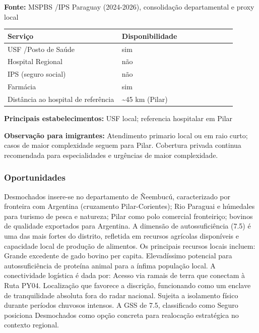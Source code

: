 \textbf{Fonte:} MSPBS /\allowbreak  IPS Paraguay (2024-2026), consolidação
departamental e proxy local

{\def\LTcaptype{none} %
\begin{longtable}{@{}>{\raggedright\arraybackslash}p{0.45\linewidth} >{\raggedright\arraybackslash}p{0.45\linewidth}@{}}
\toprule\noalign{}
Serviço & Disponibilidade \\
\midrule\noalign{}
\endhead
\bottomrule\noalign{}
\endlastfoot
USF /\allowbreak  Posto de Saúde & sim \\
Hospital Regional & não \\
IPS (seguro social) & não \\
Farmácia & sim \\
Distância ao hospital de referência & \textasciitilde45 km (Pilar) \\
\end{longtable}
}

\textbf{Principais estabelecimentos:} USF local; referencia hospitalar
em Pilar

\textbf{Observação para imigrantes:} Atendimento primario local ou em
raio curto; casos de maior complexidade seguem para Pilar. Cobertura
privada continua recomendada para especialidades e urgências de maior
complexidade.
\newpage

\subsubsection*{Oportunidades}\label{oport-desmochados-1204}
Desmochados insere-se no departamento de Ñeembucú, caracterizado por fronteira com Argentina (cruzamento Pilar-Corientes); Rio Paraguai e húmedales para turismo de pesca e natureza; Pilar como polo comercial fronteiriço; bovinos de qualidade exportados para Argentina. A dimensão de autossuficiência (7.5) é uma das mais fortes do distrito, refletida em recursos agrícolas disponíveis e capacidade local de produção de alimentos. Os principais recursos locais incluem: Grande excedente de gado bovino per capita. Elevadíssimo potencial para autossuficiência de proteína animal para a ínfima população local. A conectividade logística é dada por: Acesso via ramais de terra que conectam à Ruta PY04. Localização que favorece a discrição, funcionando como um enclave de tranquilidade absoluta fora do radar nacional. Sujeita a isolamento físico durante períodos chuvosos intensos. A GSS de 7.5, classificado como Seguro posiciona Desmochados como opção concreta para realocação estratégica no contexto regional.

